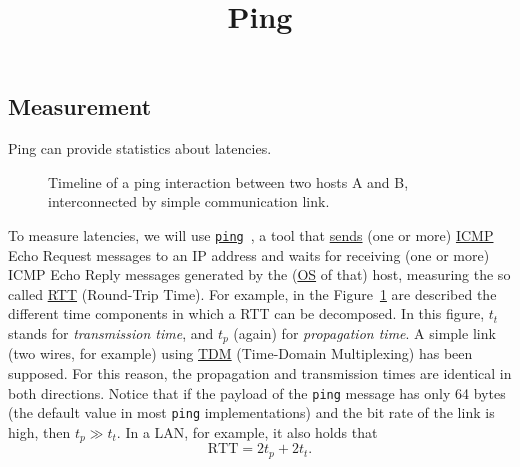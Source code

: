 
\title{Ping}

\maketitle
\tableofcontents

\subsection{Measurement}
Ping can provide statistics about latencies.

\begin{figure}
  \begin{center}
  \end{center}
  \caption{Timeline of a ping interaction between two hosts A and B,
    interconnected by simple communication link.}
  \label{fig:ping_timeline}
\end{figure}

To measure latencies, we will use
\href{https://github.com/torvalds/linux/blob/master/net/ipv4/ping.c}{\texttt{ping}}~\cite{Kurose-Ross,Forouzan},
a tool that
\href{https://en.wikipedia.org/wiki/Ping_(networking_utility)}{sends}
(one or more)
\href{https://en.wikipedia.org/wiki/Internet_Control_Message_Protocol}{ICMP}
Echo Request messages to an IP address and waits for receiving (one or
more) ICMP Echo Reply messages generated by the
(\href{https://en.wikipedia.org/wiki/Operating_system}{OS} of that)
host, measuring the so called
\href{https://en.wikipedia.org/wiki/Round-trip_delay}{RTT} (Round-Trip
Time). For example, in the Figure~\ref{fig:ping_timeline} are
described the different time components in which a RTT can be
decomposed. In this figure, $t_t$ stands for \emph{transmission time},
and $t_p$ (again) for \emph{propagation time}. A simple link (two
wires, for example) using
\href{https://en.wikipedia.org/wiki/Time-division_multiple_access}{TDM}
(Time-Domain Multiplexing) has been supposed. For this reason, the
propagation and transmission times are identical in both
directions. Notice that if the payload of the \verb|ping| message has
only 64 bytes (the default value in most \verb|ping| implementations)
and the bit rate of the link is high, then $t_p\gg t_t.$ In a LAN, for
example, it also holds that
\begin{equation}
  \text{RTT} = 2t_p + 2t_t.
  \label{eq:RTT}
\end{equation}


